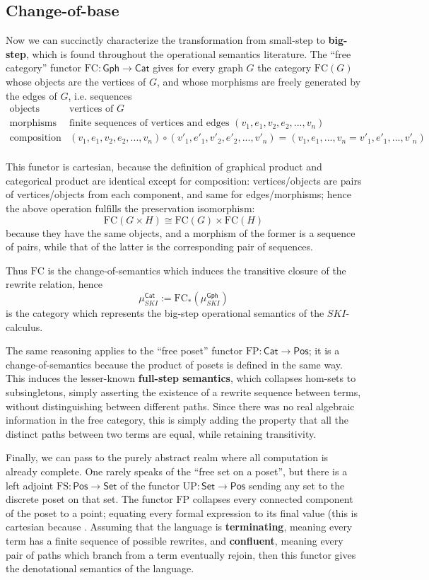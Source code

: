 \documentclass{amsart}
\theoremstyle{definition}
\newcommand{\Gph}{\mathsf{Gph}}
\newcommand{\Set}{\mathsf{Set}}
\newcommand{\Cat}{\mathsf{Cat}}
\newcommand{\Pos}{\mathsf{Pos}}
\newcommand{\FC}{\mathrm{FC}}
\newcommand{\FP}{\mathrm{FP}}
\newcommand{\FS}{\mathrm{FS}}
\newcommand{\UP}{\mathrm{UP}}
\newcommand{\maps}{\colon}
\begin{document}
\subsection{Change-of-base}
Now we can succinctly characterize the transformation from small-step to \textbf{big-step}, which is found throughout the operational semantics literature. The ``free category'' functor $\FC\maps \Gph \to \Cat$ gives for every graph $G$ the category $\FC(G)$ whose objects are the vertices of $G$, and whose morphisms are freely generated by the edges of $G$, i.e. sequences 
\[\begin{array}{rl}
\text{objects} & \text{vertices of } G\\
\text{morphisms} & \text{finite sequences of vertices and edges } (v_1,e_1,v_2,e_2,...,v_n)\\
\text{composition} & (v_1,e_1,v_2,e_2,...,v_n) \circ (v'_1,e'_1,v'_2,e'_2,...,v'_n) = (v_1,e_1,...,v_n=v'_1,e'_1,...,v'_n)\\
\end{array}\]

This functor is cartesian, because the definition of graphical product and categorical product are identical except for composition: vertices/objects are pairs of vertices/objects from each component, and same for edges/morphisms; hence the above operation fulfills the preservation isomorphism: $$\FC(G\times H) \cong \FC(G)\times \FC(H)$$ because they have the same objects, and a morphism of the former is a sequence of pairs, while that of the latter is the corresponding pair of sequences.

Thus $\FC$ is the change-of-semantics which induces the transitive closure of the rewrite relation, hence $$\mu_{SKI}^\Cat := \FC_*(\mu_{SKI}^\Gph)$$ is the category which represents the big-step operational semantics of the $SKI$-calculus.

The same reasoning applies to the ``free poset'' functor $\FP\maps \Cat \to \Pos$; it is a change-of-semantics because the product of posets is defined in the same way. This induces the lesser-known \textbf{full-step semantics}, which collapses hom-sets to subsingletons, simply asserting the existence of a rewrite sequence between terms, without distinguishing between different paths. Since there was no real algebraic information in the free category, this is simply adding the property that all the distinct paths between two terms are equal, while retaining transitivity.

Finally, we can pass to the purely abstract realm where all computation is already complete.   One rarely speaks of the ``free set on a poset'', but there is a left adjoint $\FS\maps \Pos \to \Set$ 
of the functor $\UP \maps \Set \to \Pos$ sending any set to the discrete poset on that set.
The functor $\FP$ collapses every connected component of the poset to a point; 
equating every formal expression to its final value (this is cartesian because . Assuming that the language is \textbf{terminating}, meaning every term has a finite sequence of possible rewrites, and \textbf{confluent}, meaning every pair of paths which branch from a term eventually rejoin, then this functor gives the denotational semantics of the language.
\end{document}
